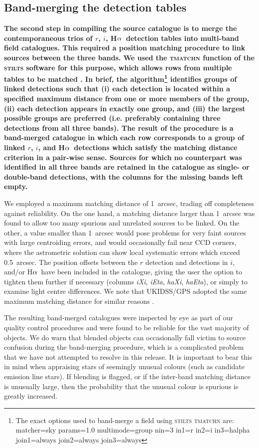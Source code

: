 \documentclass[a4paper,useAMS,usenatbib]{mn2e}
\def\ha{\mbox{H$\rm \alpha$}}
\begin{document}
\subsection{Band-merging the detection tables}

{\bf
The second step in compiling the source catalogue
is to merge the contemporaneous trios
of $r$, $i$, \ha\ detection tables
into multi-band field catalogues.
This required a position matching procedure 
to link sources between the three bands.
We used the \textsc{tmatchn} function 
of the \textsc{stilts} software
for this purpose,
which allows rows from multiple tables
to be matched \citep{Taylor2006}.
In brief, the algorithm\footnote{The exact options used
to band-merge a field using \textsc{stilts tmatchn} are: matcher=sky params=1.0 multimode=group nin=3 in1=r
in2=i in3=halpha join1=always join2=always join3=always}
identifies groups of linked detections such that
(i) each detection is located within a specified maximum distance from
one or more members of the group,
(ii) each detection appears in exactly one group, and
(iii) the largest possible groups are preferred
(i.e. preferably containing three detections from all three bands).
The result of the procedure is a band-merged catalogue
in which each row corresponds
to a group of linked $r$, $i$, and \ha\ detections
which satisfy the matching distance criterion
in a pair-wise sense.
Sources for which no counterpart was identified
in all three bands are retained in the catalogue
as single- or double-band detections, with the columns
for the missing bands left empty.

We employed a maximum matching distance of 1~arcsec,
trading off completeness against reliability.
On the one hand, a matching distance larger than 1~arcsec 
was found to allow too many spurious and unrelated sources 
to be linked. 
On the other, a value smaller than 1~arcsec 
would pose problems for very faint sources 
with large centroiding errors, 
and would occasionally fail near CCD corners,
where the astrometric solution can 
show local systematic errors which exceed 0.5~arcsec.
The position offsets between the $r$ detection and detections in $i$, and/or \ha\
have been included in the catalogue, giving the user the option to tighten them 
further if necessary
(columns \emph{iXi}, \emph{iEta}, \emph{haXi}, \emph{haEta}),
or simply to examine light centre differences.
We note that UKIDSS/GPS adopted 
the same maximum matching distance
for similar reasons \citep{Hambly2008}.

The resulting band-merged catalogues were inspected by eye
as part of our quality control procedures
and were found to be reliable for the vast majority of objects.
We do warn that blended objects
can occasionally fall victim to source confusion
during the band-merging procedure,
which is a complicated problem
that we have not attempted to resolve in this release.
It is important to bear this in mind when appraising stars
of seemingly unusual colours (such as candidate emission line stars).
If blending is flagged, or if the inter-band matching distance
is unusually large, then the probability that the unusual colour is 
spurious is greatly increased.
}
\end{document}
